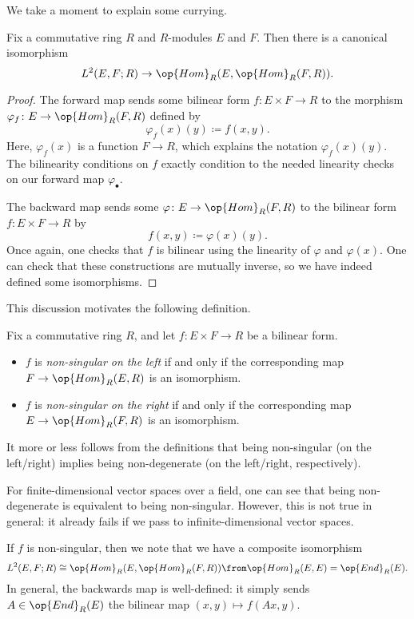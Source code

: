 \documentclass[../notes.tex]{subfiles}
\begin{document}
We take a moment to explain some currying.
\begin{proposition}
	Fix a commutative ring $R$ and $R$-modules $E$ and $F$. Then there is a canonical isomorphism
	\[L^2(E,F;R)\to\op{Hom}_R(E,\op{Hom}_R(F,R)).\]
\end{proposition}
\begin{proof}
	The forward map sends some bilinear form $f\colon E\times F\to R$ to the morphism $\varphi_f\colon E\to\op{Hom}_R(F,R)$ defined by
	\[\varphi_f(x)(y)\coloneqq f(x,y).\]
	Here, $\varphi_f(x)$ is a function $F\to R$, which explains the notation $\varphi_f(x)(y)$. The bilinearity conditions on $f$ exactly condition to the needed linearity checks on our forward map $\varphi_\bullet$.

	The backward map sends some $\varphi\colon E\to\op{Hom}_R(F,R)$ to the bilinear form $f\colon E\times F\to R$ by
	\[f(x,y)\coloneqq\varphi(x)(y).\]
	Once again, one checks that $f$ is bilinear using the linearity of $\varphi$ and $\varphi(x)$. One can check that these constructions are mutually inverse, so we have indeed defined some isomorphisms.
\end{proof}
This discussion motivates the following definition.
\begin{definition}
	Fix a commutative ring $R$, and let $f\colon E\times F\to R$ be a bilinear form.
	\begin{itemize}
		\item $f$ is \textit{non-singular on the left} if and only if the corresponding map $F\to\op{Hom}_R(E,R)$ is an isomorphism.
		\item $f$ is \textit{non-singular on the right} if and only if the corresponding map $E\to\op{Hom}_R(F,R)$ is an isomorphism.
	\end{itemize}
\end{definition}
\begin{remark}
	It more or less follows from the definitions that being non-singular (on the left/right) implies being non-degenerate (on the left/right, respectively).
\end{remark}
\begin{remark}
	For finite-dimensional vector spaces over a field, one can see that being non-degenerate is equivalent to being non-singular. However, this is not true in general: it already fails if we pass to infinite-dimensional vector spaces.
\end{remark}
\begin{remark}
	If $f$ is non-singular, then we note that we have a composite isomorphism
	\[L^2(E,F;R)\cong\op{Hom}_R(E,\op{Hom}_R(F,R))\from\op{Hom}_R(E,E)=\op{End}_R(E).\]
	In general, the backwards map is well-defined: it simply sends $A\in\op{End}_R(E)$ the bilinear map $(x,y)\mapsto f(Ax,y)$.
\end{remark}
\end{document}
